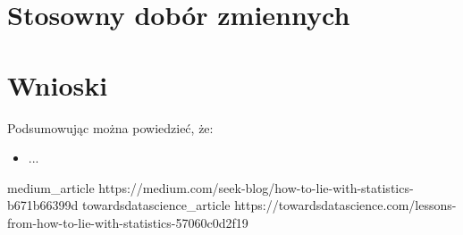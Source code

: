 \documentclass{classrep}
\begin{document}
    \section{Stosowny dobór zmiennych}
    \label{good_examples}{

    }

    \section{Wnioski} {
        Podsumowując można powiedzieć, że:
        \begin{itemize}
            \item ...

        \end{itemize}
    }

    \begin{thebibliography}{0}
        \bibitem
        {medium_article}
        {https://medium.com/seek-blog/how-to-lie-with-statistics-b671b66399d}
        \bibitem
        {towardsdatascience_article}
        {https://towardsdatascience.com/lessons-from-how-to-lie-with-statistics-57060c0d2f19}
    \end{thebibliography}
\end{document}
